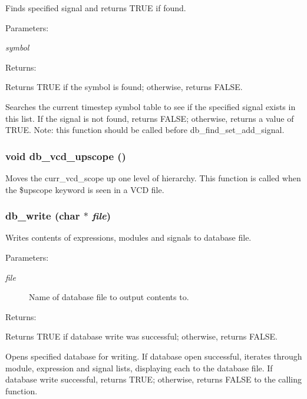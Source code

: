 Finds specified signal and returns TRUE if found.

\begin{Desc}
\item[Parameters: ]\par
\begin{description}
\item[{\em 
symbol}]\end{description}
\end{Desc}
\begin{Desc}
\item[Returns: ]\par
Returns TRUE if the symbol is found; otherwise, returns FALSE.\end{Desc}
Searches the current timestep symbol table to see if the specified signal exists in this list. If the signal is not found, returns FALSE; otherwise, returns a value of TRUE. Note: this function should be called before db\_\-find\_\-set\_\-add\_\-signal. 
\subsubsection{\setlength{\rightskip}{0pt plus 5cm}void db\_\-vcd\_\-upscope ()}\label{db_8c_a28}


Moves the curr\_\-vcd\_\-scope up one level of hierarchy. This function is called when the \$upscope keyword is seen in a VCD file. 
\subsubsection{ db\_\-write (char $\ast$ {\em file})}\label{db_8c_a13}


Writes contents of expressions, modules and signals to database file.

\begin{Desc}
\item[Parameters: ]\par
\begin{description}
\item[{\em 
file}]Name of database file to output contents to.\end{description}
\end{Desc}
\begin{Desc}
\item[Returns: ]\par
Returns TRUE if database write was successful; otherwise, returns FALSE.\end{Desc}
Opens specified database for writing. If database open successful, iterates through module, expression and signal lists, displaying each to the database file. If database write successful, returns TRUE; otherwise, returns FALSE to the calling function. 

